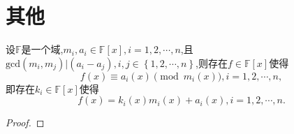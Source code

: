 \documentclass[../../main.tex]{subfiles}
\begin{document}
\section{其他}

\begin{theorem}\label{theorem:中国剩余定理推广(模不互质的情况)}
设$\mathbb{F}$是一个域,$m_i,a_i\in \mathbb{F}[x],i=1,2,\cdots,n$,且$\mathrm{gcd}\left( m_i,m_j \right) |\left( a_i-a_j \right) ,i,j\in \left\{ 1,2,\cdots ,n \right\}$,则存在$f\in\mathbb{F}[x]$使得
$$
f(x)\equiv a_i(x)\pmod{m_i(x)},i=1,2,\cdots,n,
$$
即存在$k_i\in\mathbb{F}[x]$使得
$$
f(x)=k_i(x)m_i(x)+a_i(x),i=1,2,\cdots,n.
$$
\end{theorem}
\begin{proof}

\end{proof}
\end{document}
